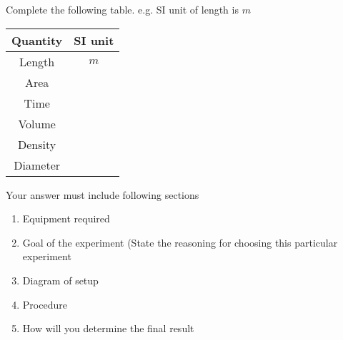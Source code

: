 \documentclass[12pt,addpoints]{exam}
\begin{document}
\begin{questions}

\myquestion[5] Complete the following table. e.g. SI unit of length is $m$

\begin{center}
\begin{tabular}{||c | c||}
 \hline
Quantity & SI unit  \\ [0.5ex]
 \hline\hline
 Length & $m$ \\
 \hline
 Area  &   \\
 \hline
 Time  &  \\
 \hline
 Volume  &  \\
 \hline
 Density &  \\
 \hline
  Diameter & \\
 \hline
\end{tabular}
\end{center}




\newpage




 Your answer must include following sections
 \begin{enumerate}
   \item Equipment required

   \item Goal of the experiment (State the reasoning for choosing this particular experiment

   \item Diagram of setup

   \item Procedure

   \item How will you determine the final result


\end{enumerate}
\end{questions}
\end{document}
